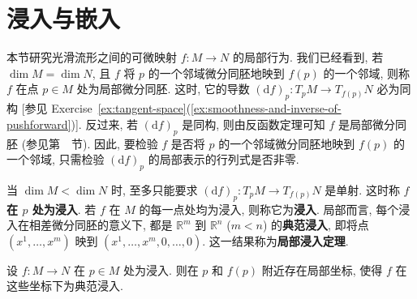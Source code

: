 \section{浸入与嵌入}\label{sec:immersions-embeddings}

本节研究光滑流形之间的可微映射 $f:M\to N$ 的局部行为. 我们已经看到, 若 $\dim M=\dim N$, 且 $f$ 将 $p$ 的一个邻域微分同胚地映到 $f(p)$ 的一个邻域, 则称 $f$ 在点 $p\in M$ 处为局部微分同胚. 这时, 它的导数 $(\mathrm{d}f)_p:T_pM\to T_{f(p)}N$ 必为同构 [参见 Exercise~\ref{ex:tangent-space}(\ref{ex:smoothness-and-inverse-of-pushforward})]. 反过来, 若 $(\mathrm{d}f)_p$ 是同构, 则由反函数定理可知 $f$ 是局部微分同胚 (参见第~~节). 因此, 要检验 $f$ 是否将 $p$ 的一个邻域微分同胚地映到 $f(p)$ 的一个邻域, 只需检验 $(\mathrm{d}f)_p$ 的局部表示的行列式是否非零.

当 $\dim M<\dim N$ 时, 至多只能要求 $(\mathrm{d}f)_p:T_pM\to T_{f(p)}N$ 是单射. 这时称 $f$ \textbf{在 $p$ 处为浸入}. 若 $f$ 在 $M$ 的每一点处均为浸入, 则称它为\textbf{浸入}. 局部而言, 每个浸入在相差微分同胚的意义下, 都是 $\mathbb{R}^m$ 到 $\mathbb{R}^n$ ($m<n$) 的\textbf{典范浸入}, 即将点 $(x^1,\ldots,x^m)$ 映到 $(x^1,\ldots,x^m,0,\ldots,0)$. 这一结果称为\textbf{局部浸入定理}.

\begin{RiemannTheorem}\label{thm:local-immersion-normal-form}
设 $f:M\to N$ 在 $p\in M$ 处为浸入. 则在 $p$ 和 $f(p)$ 附近存在局部坐标, 使得 $f$ 在这些坐标下为典范浸入.
\end{RiemannTheorem}

